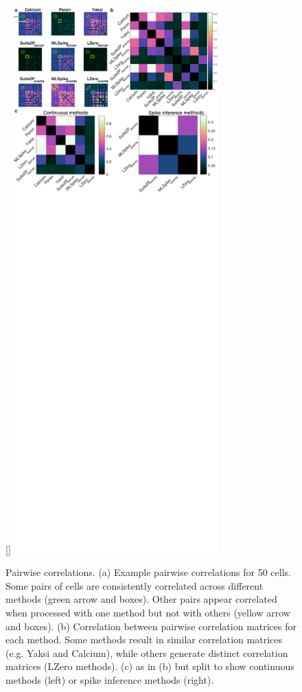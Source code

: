 \documentclass[a4paper,10pt,twocolumn]{article}
\begin{document}
\begin{figure}
[\FBwidth]
{\includegraphics[trim={0 440 0 0},clip,width=0.7\textwidth]{full_figs_19v2/why_deconvolve_F8_19v2.png}}
{\caption{\label{fig:cxy_comparison}Pairwise correlations. (a) Example pairwise correlations for 50 cells. Some pairs of cells are consistently correlated across different methods (green arrow and boxes). Other pairs appear correlated when processed with one method but not with others (yellow arrow and boxes). (b) Correlation between pairwise correlation matrices for each method. Some methods result in similar correlation matrices (e.g. Yaksi and Calcium), while others generate distinct correlation matrices (LZero methods). (c) as in (b) but split to show continuous methods (left) or spike inference methods (right).}}
\end{figure}
\end{document}
